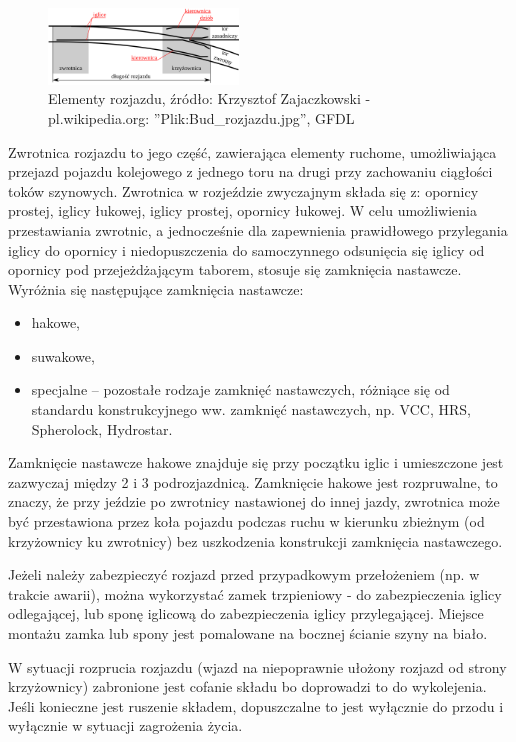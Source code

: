 \begin{figure}
	\includegraphics[width=0.45\textwidth]{skryptkierownik-img/rozjazd.png}
	\caption{Elementy rozjazdu, źródło: Krzysztof Zajaczkowski - pl.wikipedia.org: ''Plik:Bud\_rozjazdu.jpg'', GFDL}
	\label{fig:rozjazd}
\end{figure}
Zwrotnica rozjazdu to jego część, zawierająca elementy ruchome, umożliwiająca przejazd pojazdu kolejowego z jednego toru na drugi przy zachowaniu ciągłości toków szynowych.
Zwrotnica w rozjeździe zwyczajnym składa się z: opornicy prostej, iglicy łukowej, iglicy prostej, opornicy łukowej.
W celu umożliwienia przestawiania zwrotnic, a jednocześnie dla zapewnienia prawidłowego przylegania iglicy do opornicy i niedopuszczenia do samoczynnego odsunięcia się iglicy od opornicy pod przejeżdżającym taborem, stosuje się zamknięcia nastawcze.
Wyróżnia się następujące zamknięcia nastawcze:
\begin{itemize}
	\item hakowe,
	\item suwakowe,
	\item specjalne – pozostałe rodzaje zamknięć nastawczych, różniące się od standardu
	konstrukcyjnego ww. zamknięć nastawczych, np. VCC, HRS, Spherolock, Hydrostar.
\end{itemize}

Zamknięcie nastawcze hakowe znajduje się przy początku iglic i umieszczone jest zazwyczaj między 2 i 3 podrozjazdnicą.
Zamknięcie hakowe jest rozpruwalne, to znaczy, że przy jeździe po zwrotnicy nastawionej do innej jazdy, zwrotnica może być przestawiona przez koła pojazdu podczas ruchu w kierunku zbieżnym (od krzyżownicy ku zwrotnicy) bez uszkodzenia konstrukcji zamknięcia nastawczego.

Jeżeli należy zabezpieczyć rozjazd przed przypadkowym przełożeniem (np. w trakcie awarii), można wykorzystać zamek trzpieniowy - do zabezpieczenia iglicy odlegającej, lub sponę iglicową do zabezpieczenia iglicy przylegającej. Miejsce montażu zamka lub spony jest pomalowane na bocznej ścianie szyny na biało.

W sytuacji rozprucia rozjazdu (wjazd na niepoprawnie ułożony rozjazd od strony krzyżownicy) zabronione jest cofanie składu bo doprowadzi to do wykolejenia. Jeśli konieczne jest ruszenie składem, dopuszczalne to jest wyłącznie do przodu i wyłącznie w sytuacji zagrożenia życia.

